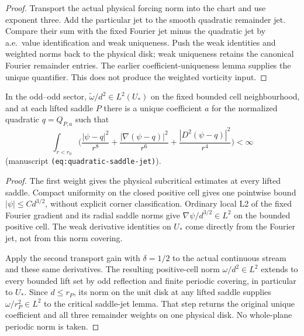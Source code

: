 \begin{proof}
\leanok
Transport the actual physical forcing norm into the chart and use exponent
three. Add the particular jet to the smooth quadratic remainder jet.
Compare their sum with the fixed Fourier jet minus the quadratic jet by
a.e.\ value identification and weak uniqueness.
Push the weak identities and weighted norms back to the physical disk;
weak uniqueness retains the canonical Fourier remainder entries.
The earlier coefficient-uniqueness lemma supplies the unique quantifier.
This does not produce the weighted vorticity input.
\end{proof}

\begin{proposition}
\label{prop:saddle-dd}
\leanok
In the odd--odd sector, $\widetilde\omega/d^2\in L^2(U_*)$ on the fixed
bounded cell neighbourhood, and at each lifted saddle $P$ there is a
unique coefficient $a$ for the normalized quadratic $q=Q_{P,a}$ such that
\[
  \int_{r<r_0}\Big(\frac{|\psi-q|^2}{r^8}+\frac{|\nabla(\psi-q)|^2}{r^6}
  +\frac{|D^2(\psi-q)|^2}{r^4}\Big)<\infty
\]
(manuscript \texttt{(eq:quadratic-saddle-jet)}).
\end{proposition}

\begin{proof}
\leanok
The first weight gives the physical subcritical estimates at every lifted
saddle. Compact uniformity on the closed positive cell gives one pointwise
bound $|\psi|\le Cd^{3/2}$, without explicit corner classification.
Ordinary local L2 of the fixed Fourier gradient and its radial saddle
norms give $\nabla\psi/d^{3/2}\in L^2$ on the bounded positive cell.
The weak derivative identities on $U_*$ come directly from the Fourier jet,
not from this norm covering.

Apply the second transport gain with $\delta=1/2$ to the actual continuous
stream and these same derivatives. The resulting positive-cell norm
$\omega/d^2\in L^2$ extends to every bounded lift set by odd reflection
and finite periodic covering, in particular to $U_*$.
Since $d\le r_P$, its norm on the unit disk at any lifted saddle supplies
$\omega/r_P^2\in L^2$ to the critical saddle-jet lemma.
That step returns the original unique coefficient and all three remainder
weights on one physical disk. No whole-plane periodic norm is taken.
\end{proof}

